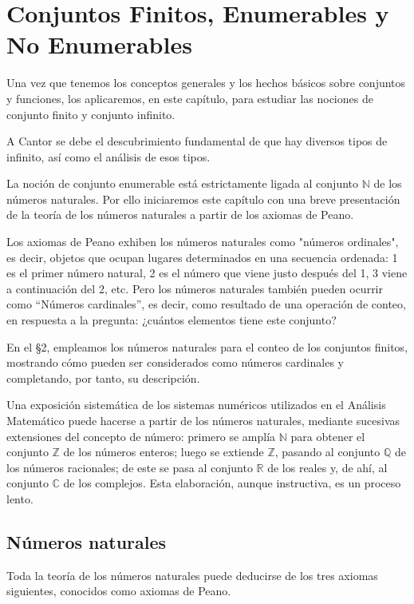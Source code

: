 \chapter{Conjuntos Finitos, Enumerables y No Enumerables}

Una vez que tenemos los conceptos generales y los hechos básicos sobre conjuntos y funciones, los aplicaremos, en este capítulo, para estudiar las nociones de conjunto finito y conjunto infinito.

A Cantor se debe el descubrimiento fundamental de que hay diversos tipos de infinito, así como el análisis de esos tipos.

La noción de conjunto enumerable está estrictamente ligada al conjunto \(\mathbb{N}\) de los números naturales. Por ello iniciaremos este capítulo con una breve presentación de la teoría de los números naturales a partir de los axiomas de Peano.

Los axiomas de Peano exhiben los números naturales como "números ordinales", es decir, objetos que ocupan lugares determinados en una secuencia ordenada: 1 es el primer número natural, 2 es el número que viene justo después del 1, 3 viene a continuación del 2, etc. Pero los números naturales también pueden ocurrir como “Números cardinales”, es decir, como resultado de una operación de conteo, en respuesta a la pregunta: ¿cuántos elementos tiene este conjunto?

En el §2, empleamos los números naturales para el conteo de los conjuntos finitos, mostrando cómo pueden ser considerados como números cardinales y completando, por tanto, su descripción.

Una exposición sistemática de los sistemas numéricos utilizados en el Análisis Matemático puede hacerse a partir de los números naturales, mediante sucesivas extensiones del concepto de número: primero se amplía \(\mathbb{N}\) para obtener el conjunto \(\mathbb{Z}\) de los números enteros; luego se extiende \(\mathbb{Z}\), pasando al conjunto \(\mathbb{Q}\) de los números racionales; de este se pasa al conjunto \(\mathbb{R}\) de los reales y, de ahí, al conjunto \(\mathbb{C}\) de los complejos. Esta elaboración, aunque instructiva, es un proceso lento.

\section{Números naturales}

Toda la teoría de los números naturales puede deducirse de los tres axiomas siguientes, conocidos como axiomas de Peano.

